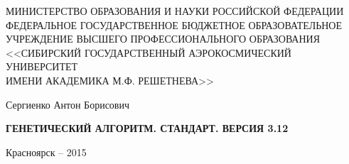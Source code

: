 \thispagestyle{empty}

\begin{center}
\MakeUppercase{Министерство образования и науки Российской Федерации} \\ 
\MakeUppercase{федеральное государственное бюджетное образовательное} \\
\MakeUppercase{учреждение высшего профессионального образования } \\
\MakeUppercase{<<Сибирский государственный аэрокосмический университет} \\
\MakeUppercase{имени академика М.Ф. Решетнева>>}
\end{center}

\vspace{20mm}

\vspace{30mm}
\begin{center}
{\large Сергиенко Антон Борисович}
\end{center}

\vspace{5mm}
\begin{center}
{\bf \large \MakeUppercase{Генетический алгоритм. Стандарт. Версия 3.12}
\par}

\vspace{10mm}

\vspace{10mm}

\end{center}

\vspace{80mm}

\vspace{20mm}
\begin{center}
{Красноярск -- 2015}
\end{center}

\newpage